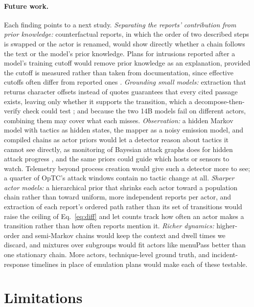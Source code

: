 \documentclass[letterpaper]{article} %
\begin{document}
\paragraph{Future work.} Each finding points to a next study. \emph{Separating the reports' contribution from prior knowledge:} counterfactual reports, in which the order of two described steps is swapped or the actor is renamed, would show directly whether a chain follows the text or the model's prior knowledge. Plans for intrusions reported after a model's training cutoff would remove prior knowledge as an explanation, provided the cutoff is measured rather than taken from documentation, since effective cutoffs often differ from reported ones \citep{cheng2024dated}. \emph{Grounding small models:} extraction that returns character offsets instead of quotes guarantees that every cited passage exists, leaving only whether it supports the transition, which a decompose-then-verify check could test \citep{wanner2025dndscore}; and because the two 14B models fail on different actors, combining them may cover what each misses. \emph{Observation:} a hidden Markov model with tactics as hidden states, the mapper as a noisy emission model, and compiled chains as actor priors would let a detector reason about tactics it cannot see directly, as monitoring of Bayesian attack graphs does for hidden attack progress \citep{kazeminajafabadi2023monitoring}, and the same priors could guide which hosts or sensors to watch. Telemetry beyond process creation would give such a detector more to see; a quarter of OpTC's attack windows contain no tactic change at all. \emph{Sharper actor models:} a hierarchical prior that shrinks each actor toward a population chain rather than toward uniform, more independent reports per actor, and extraction of each report's ordered path rather than its set of transitions would raise the ceiling of Eq.~\eqref{eq:diff} and let counts track how often an actor makes a transition rather than how often reports mention it. \emph{Richer dynamics:} higher-order and semi-Markov chains would keep the context and dwell times we discard, and mixtures over subgroups would fit actors like menuPass better than one stationary chain. More actors, technique-level ground truth, and incident-response timelines in place of emulation plans would make each of these testable.

\section{Limitations}
\end{document}
